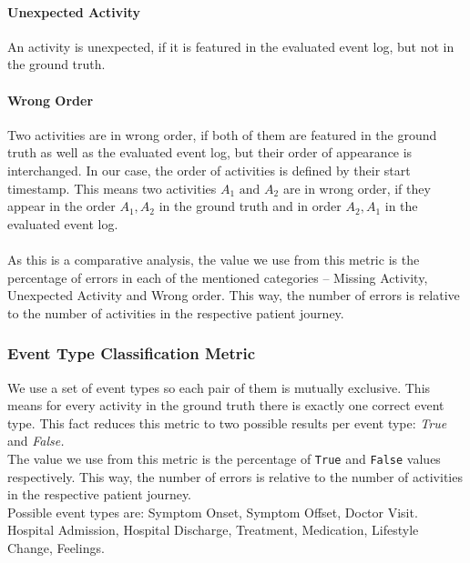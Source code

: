 \paragraph{Unexpected Activity} An activity is unexpected, if it is featured in the evaluated event log, but not in the ground truth.
\paragraph{Wrong Order} Two activities are in wrong order, if both of them are featured in the ground truth as well as the evaluated event log, but their order of appearance is interchanged. In our case, the order of activities is defined by their start timestamp. This means two activities $A_1 \text{ and } A_2$ are in wrong order, if they appear in the order $A_1,A_2$ in the ground truth and in order $A_2, A_1$ in the evaluated event log.\\\\
As this is a comparative analysis, the value we use from this metric is the percentage of errors in each of the mentioned categories – Missing Activity, Unexpected Activity and Wrong order. This way, the number of errors is relative to the number of activities in the respective patient journey.

\subsubsection{Event Type Classification Metric}\label{sec:eventtype_metric}
We use a set of event types so each pair of them is mutually exclusive. This means for every activity in the ground truth there is exactly one correct event type. This fact reduces this metric to two possible results per event type: \emph{True} and \emph{False.}\\
The value we use from this metric is the percentage of \verb|True| and \verb|False| values respectively. This way, the number of errors is relative to the number of activities in the respective patient journey.\\
Possible event types are: Symptom Onset, Symptom Offset, Doctor Visit. Hospital Admission, Hospital Discharge, Treatment, Medication, Lifestyle Change, Feelings.

